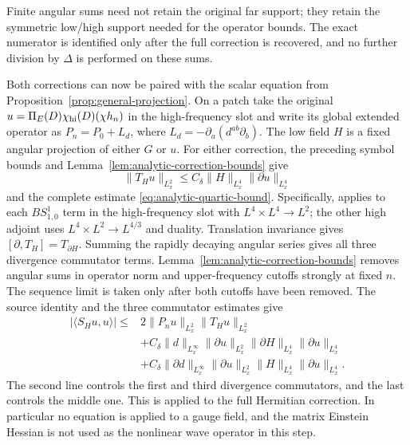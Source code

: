 \documentclass[11pt,a4paper]{article}
\numberwithin{equation}{section}
\newcommand{\ip}[2]{\langle #1,#2\rangle}
\theoremstyle{definition}
\begin{document}
Finite angular sums need not retain the original far support; they
retain the symmetric low/high support needed for the operator bounds.
The exact numerator is identified only after the full correction is
recovered, and no further division by $\Delta$ is performed on these sums.

Both corrections can now be paired with the scalar equation from
Proposition~\ref{prop:general-projection}. On a patch take the original
$u=\Pi_E(D)\chi_{\rm hi}(D)(\chi h_n)$ in the high-frequency slot and write its global extended
operator as $P_n=P_0+L_d$, where $L_d=-\partial_a(d^{ab}\partial_b)$.
The low field $H$ is a fixed angular projection of either $G$ or $u$.
For either correction, the preceding symbol bounds and Lemma~\ref{lem:analytic-correction-bounds} give
\begin{equation*}
\|T_Hu\|_{L^2_x}\leq C_\delta\|H\|_{L^4_x}\|\partial u\|_{L^4_x}
\end{equation*}
and the complete estimate \eqref{eq:analytic-quartic-bound}. Specifically,
\cite[Theorem 1]{BenyiOh} applies to each $BS^1_{1,0}$ term in the
high-frequency slot with $L^4\times L^4\to L^2$; the other high adjoint uses
$L^4\times L^2\to L^{4/3}$ and duality. Translation invariance gives
$[\partial,T_H]=T_{\partial H}$. Summing the rapidly decaying angular
series gives all three divergence commutator terms.
Lemma~\ref{lem:analytic-correction-bounds} removes angular sums in
operator norm and upper-frequency cutoffs strongly at fixed $n$.
The sequence limit is taken only after both cutoffs have been removed.
The source identity and the three commutator estimates give
\begin{equation}\label{eq:var-correction-energy}
\begin{split}
|\ip{S_Hu}{u}|
\leq{}&2\|P_nu\|_{L^2_x}\|T_Hu\|_{L^2_x}\\
&+C_\delta\|d\|_{L^\infty_x}\|\partial u\|_{L^2_x}
                         \|\partial H\|_{L^4_x}\|\partial u\|_{L^4_x}\\
&+C_\delta\|\partial d\|_{L^\infty_x}\|\partial u\|_{L^2_x}
                         \|H\|_{L^4_x}\|\partial u\|_{L^4_x}.
\end{split}
\end{equation}
The second line controls the first and third divergence commutators,
and the last controls the middle one. This is applied to the full
Hermitian correction. In particular no equation is applied to a gauge
field, and the matrix Einstein Hessian is not used as the nonlinear
wave operator in this step.
\end{document}
